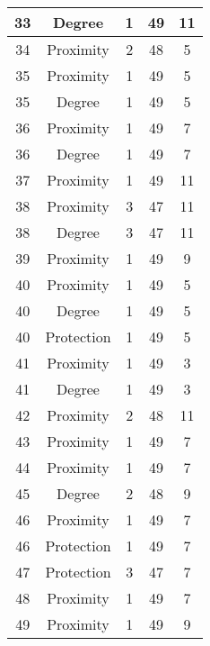 \documentclass[results.tex]{subfiles}
\begin{document}
\begin{center}
\begin{tabular}{| c || c | c | c | c |}
    33 & Degree & 1 & 49 & 11 \\ 
    \hline
    34 & Proximity & 2 & 48 & 5 \\ 
    \hline
    35 & Proximity & 1 & 49 & 5 \\ 
    \hline
    35 & Degree & 1 & 49 & 5 \\ 
    \hline
    36 & Proximity & 1 & 49 & 7 \\ 
    \hline
    36 & Degree & 1 & 49 & 7 \\ 
    \hline
    37 & Proximity & 1 & 49 & 11 \\ 
    \hline
    38 & Proximity & 3 & 47 & 11 \\ 
    \hline
    38 & Degree & 3 & 47 & 11 \\ 
    \hline
    39 & Proximity & 1 & 49 & 9 \\ 
    \hline
    40 & Proximity & 1 & 49 & 5 \\ 
    \hline
    40 & Degree & 1 & 49 & 5 \\ 
    \hline
    40 & Protection & 1 & 49 & 5 \\ 
    \hline
    41 & Proximity & 1 & 49 & 3 \\ 
    \hline
    41 & Degree & 1 & 49 & 3 \\ 
    \hline
    42 & Proximity & 2 & 48 & 11 \\ 
    \hline
    43 & Proximity & 1 & 49 & 7 \\ 
    \hline
    44 & Proximity & 1 & 49 & 7 \\ 
    \hline
    45 & Degree & 2 & 48 & 9 \\ 
    \hline
    46 & Proximity & 1 & 49 & 7 \\ 
    \hline
    46 & Protection & 1 & 49 & 7 \\ 
    \hline
    47 & Protection & 3 & 47 & 7 \\ 
    \hline
    48 & Proximity & 1 & 49 & 7 \\ 
    \hline
    49 & Proximity & 1 & 49 & 9 \\ 
    \hline   \end{tabular}
\end{center}
\end{document}
